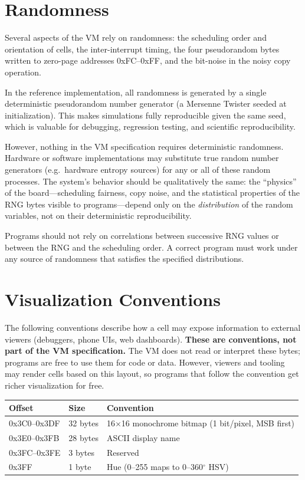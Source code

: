 \documentclass{article}
\begin{document}
\section{Randomness}

Several aspects of the VM rely on randomness: the scheduling order and orientation
of cells, the inter-interrupt timing, the four pseudorandom bytes written to
zero-page addresses 0xFC--0xFF, and the bit-noise in the noisy copy operation.

In the reference implementation, all randomness is generated by a single
deterministic pseudorandom number generator (a Mersenne Twister seeded at
initialization). This makes simulations fully reproducible given the same
seed, which is valuable for debugging, regression testing, and scientific
reproducibility.

However, nothing in the VM specification requires deterministic randomness.
Hardware or software implementations may substitute true random number
generators (e.g.\ hardware entropy sources) for any or all of these random
processes. The system's behavior should be qualitatively the same: the
``physics'' of the board---scheduling fairness, copy noise, and the
statistical properties of the RNG bytes visible to programs---depend only
on the \emph{distribution} of the random variables, not on their
deterministic reproducibility.

Programs should not rely on correlations between successive RNG values
or between the RNG and the scheduling order. A correct program must work
under any source of randomness that satisfies the specified distributions.

\section{Visualization Conventions}

The following conventions describe how a cell may expose information to external
viewers (debuggers, phone UIs, web dashboards). \textbf{These are conventions,
not part of the VM specification.} The VM does not read or interpret these bytes;
programs are free to use them for code or data. However, viewers and tooling may
render cells based on this layout, so programs that follow the convention get
richer visualization for free.

\begin{tabular}{l|l|p{}}
  Offset & Size & Convention \\ \hline
  0x3C0--0x3DF & 32 bytes & 16$\times$16 monochrome bitmap (1 bit/pixel, MSB first) \\
  0x3E0--0x3FB & 28 bytes & ASCII display name \\
  0x3FC--0x3FE & 3 bytes  & Reserved \\
  0x3FF        & 1 byte   & Hue (0--255 maps to 0--360$^\circ$ HSV)
\end{tabular}
\end{document}
